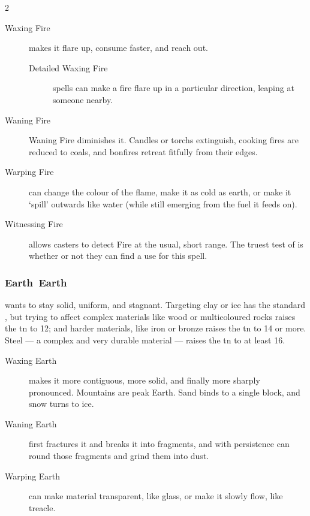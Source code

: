 \begin{multicols}{2}
\begin{description}
  \item[Waxing Fire]
  makes it flare up, consume faster, and reach out.
  \begin{description}
    \item[Detailed Waxing Fire]
    \glspl{spell} can make a fire flare up in a particular direction, leaping at someone nearby.
  \end{description}

  \item[Waning Fire]
  Waning Fire diminishes it. Candles or \glspl{torch} extinguish, cooking fires
  are reduced to coals, and bonfires retreat fitfully from their edges.

  \item[Warping Fire]
  can change the colour of the flame, make it as cold as earth, or make it `spill' outwards like water (while still emerging from the fuel it feeds on).

  \item[Witnessing Fire]
  allows casters to detect Fire at the usual, short range.
  The truest test of  is whether or not they can find a use for this \gls{spell}.
\end{description}

\subsubsection[Earth]{\gls{Earth}~Earth}
wants to stay solid, uniform, and stagnant.
Targeting clay or ice has the standard \tn[7], but trying to affect complex materials like wood or multicoloured rocks raises the \gls{tn} to 12; and harder materials, like iron or bronze raises the \gls{tn} to 14 or more.
Steel --- a complex and very durable material --- raises the \gls{tn} to at least 16.

\begin{description}
  \item[Waxing Earth]
  makes it more contiguous, more solid, and finally more sharply pronounced.
  Mountains are peak Earth.  Sand binds to a single block, and snow turns to
  ice.

  \item[Waning Earth]
  first fractures it and breaks it into fragments, and with persistence
  can round those fragments and grind them into dust.

  \item[Warping Earth]
  can make material transparent, like glass, or make it slowly flow, like treacle.


\end{description}
\end{multicols}
